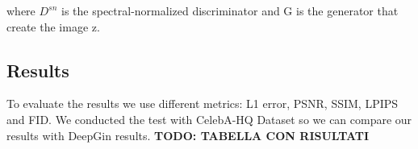 \documentclass[10pt,twocolumn,letterpaper]{article}
\begin{document}
where \(D^{sn}\) is the spectral-normalized discriminator and G is the generator that create the image z.
\subsection{Results}
To evaluate the results we use different metrics: L1 error, PSNR, SSIM, LPIPS and FID. We conducted the test with CelebA-HQ Dataset so we can compare our results with DeepGin results.
\textbf{TODO: TABELLA CON RISULTATI}


{\small


}
\end{document}
